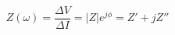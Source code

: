 \documentclass[preview]{standalone}
\begin{document}
\[Z(\omega) = \frac{\Delta V}{\Delta I} = |Z| e^{j\phi} = Z' + jZ'' \tag{3.17}\]
\end{document}
